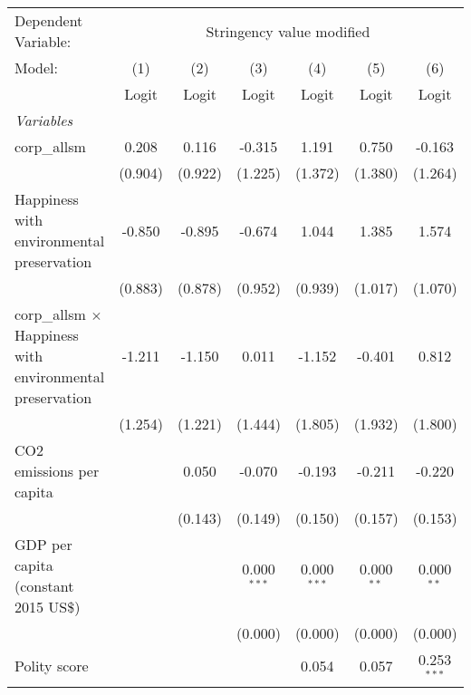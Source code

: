 
\begingroup
\centering
\begin{tabular}{lcccccc}
   \toprule
   Dependent Variable: & \multicolumn{6}{c}{Stringency value modified}\\
   Model:                                                           & (1)     & (2)     & (3)           & (4)           & (5)          & (6)\\  
                                                                    &  Logit  & Logit   & Logit         & Logit         & Logit        & Logit\\  
   \midrule
   \emph{Variables}\\
   corp\_allsm                                                      & 0.208   & 0.116   & -0.315        & 1.191         & 0.750        & -0.163\\   
                                                                    & (0.904) & (0.922) & (1.225)       & (1.372)       & (1.380)      & (1.264)\\   
   Happiness with environmental preservation                        & -0.850  & -0.895  & -0.674        & 1.044         & 1.385        & 1.574\\   
                                                                    & (0.883) & (0.878) & (0.952)       & (0.939)       & (1.017)      & (1.070)\\   
   corp\_allsm $\times$ Happiness with environmental preservation   & -1.211  & -1.150  & 0.011         & -1.152        & -0.401       & 0.812\\   
                                                                    & (1.254) & (1.221) & (1.444)       & (1.805)       & (1.932)      & (1.800)\\   
   CO2 emissions per capita                                         &         & 0.050   & -0.070        & -0.193        & -0.211       & -0.220\\   
                                                                    &         & (0.143) & (0.149)       & (0.150)       & (0.157)      & (0.153)\\   
   GDP per capita (constant 2015 US\$)                              &         &         & 0.000$^{***}$ & 0.000$^{***}$ & 0.000$^{**}$ & 0.000$^{**}$\\   
                                                                    &         &         & (0.000)       & (0.000)       & (0.000)      & (0.000)\\   
   Polity score                                                     &         &         &               & 0.054         & 0.057        & 0.253$^{***}$\\   

\end{tabular}
